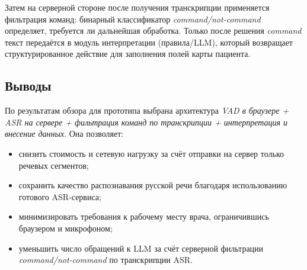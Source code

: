 Затем на серверной стороне после получения транскрипции применяется фильтрация команд: бинарный классификатор \textit{command/not-command} определяет, требуется ли дальнейшая обработка.
Только после решения \textit{command} текст передаётся в модуль интерпретации (правила/LLM), который возвращает структурированное действие для заполнения полей карты пациента.

\subsection{Выводы}
\label{subsec:rw_conclusions}

По результатам обзора для прототипа выбрана архитектура \emph{VAD в браузере + ASR на сервере + фильтрация команд по транскрипции + интерпретация и внесение данных}.
Она позволяет:
\begin{itemize}
    \item снизить стоимость и сетевую нагрузку за счёт отправки на сервер только речевых сегментов;
    \item сохранить качество распознавания русской речи благодаря использованию готового ASR‑сервиса;
    \item минимизировать требования к рабочему месту врача, ограничившись браузером и микрофоном;
    \item уменьшить число обращений к LLM за счёт серверной фильтрации \textit{command/not-command} по транскрипции ASR.
\end{itemize}
